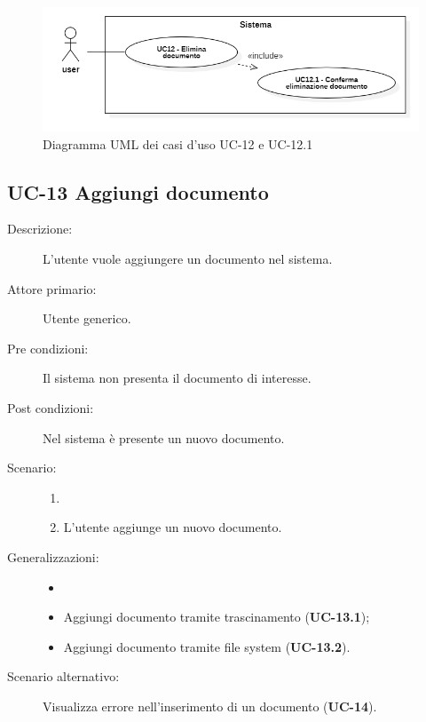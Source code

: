 \begin{figure}[H]
    \centering
    \includegraphics[width=0.8\linewidth]{UC12.PNG}
    \caption{Diagramma UML dei casi d'uso UC-12 e UC-12.1}
    \label{fig:UC12-12.1}
\end{figure}

\subsection{UC-13 Aggiungi documento}
\begin{description}
    \item[Descrizione:] L'utente vuole aggiungere un documento nel sistema.
    \item[Attore primario:] Utente generico.
    \item[Pre condizioni:] Il sistema non presenta il documento di interesse.
    \item[Post condizioni:] Nel sistema è presente un nuovo documento.
    \item[Scenario:]
    \begin{enumerate}
        \item[]
        \item L’utente aggiunge un nuovo documento.
    \end{enumerate}
    \item[Generalizzazioni:] 
    \begin{itemize}
        \item[] 
        \item Aggiungi documento tramite trascinamento (\textbf{UC-13.1});
        \item Aggiungi documento tramite file system (\textbf{UC-13.2}).
    \end{itemize} 
    \item[Scenario alternativo:] Visualizza errore nell'inserimento di un documento (\textbf{UC-14}).
\end{description}

